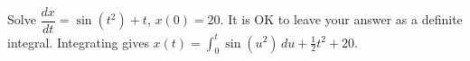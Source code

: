 {Solve $\dfrac{dx}{dt} = \sin(t^2)+t$, $x(0)=20$.  It is OK to leave your
answer as a definite integral.}
{Integrating gives $x(t) = \int_0^t \sin(u^2)\,du + \frac{1}{2}t^2 + 20$.}